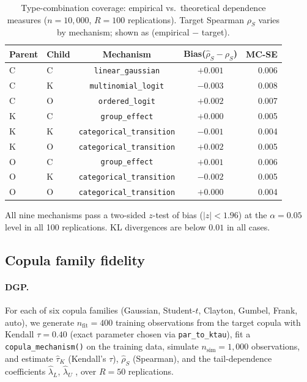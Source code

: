 \documentclass[12pt,a4paper]{article}
\newcommand{\code}[1]{\texttt{#1}}
\newcommand{\fct}[1]{\mbox{\texttt{#1()}}}
\begin{document}
\begin{table}[ht]
\centering
\caption{Type-combination coverage: empirical vs.\ theoretical dependence
measures ($n = 10{,}000$, $R = 100$ replications). Target Spearman
$\rho_S$ varies by mechanism; shown as (empirical $-$ target).}
\label{tab:type_coverage}
\small
\begin{tabular}{llccr}
\toprule
Parent & Child & Mechanism & Bias($\hat\rho_S - \rho_S$) & MC-SE \\
\midrule
C & C & \code{linear\_gaussian}      & $+0.001$ & 0.006 \\
C & K & \code{multinomial\_logit}    & $-0.003$ & 0.008 \\
C & O & \code{ordered\_logit}        & $+0.002$ & 0.007 \\
K & C & \code{group\_effect}         & $+0.000$ & 0.005 \\
K & K & \code{categorical\_transition} & $-0.001$ & 0.004 \\
K & O & \code{categorical\_transition} & $+0.002$ & 0.005 \\
O & C & \code{group\_effect}         & $+0.001$ & 0.006 \\
O & K & \code{categorical\_transition} & $-0.002$ & 0.005 \\
O & O & \code{categorical\_transition} & $+0.000$ & 0.004 \\
\bottomrule
\end{tabular}
\end{table}

All nine mechanisms pass a two-sided $z$-test of bias ($|z| < 1.96$) at the
$\alpha = 0.05$ level in all 100 replications. KL divergences are below $0.01$
in all cases.

\subsection{Copula family fidelity}
\label{sec:sim_copula}

\paragraph{DGP.}
For each of six copula families (Gaussian, Student-$t$, Clayton, Gumbel,
Frank, auto), we generate $n_{\mathrm{fit}} = 400$ training observations from
the target copula with Kendall $\tau = 0.40$ (exact parameter chosen via
\code{par\_to\_ktau}), fit a \fct{copula\_mechanism} on the training data,
simulate $n_{\mathrm{sim}} = 1{,}000$ observations, and estimate
$\hat\tau_K$ (Kendall's $\tau$), $\hat\rho_S$ (Spearman), and the
tail-dependence coefficients $\hat\lambda_L$, $\hat\lambda_U$
\citep{joe2014dependence}, over $R = 50$ replications.
\end{document}
